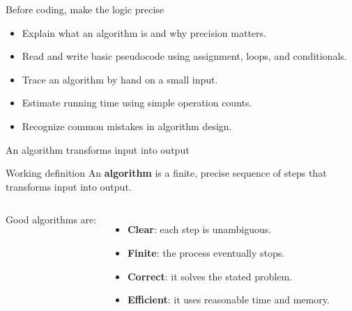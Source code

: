 \documentclass[11pt,aspectratio=43]{beamer}
\begin{document}
\begin{frame}{Before coding, make the logic precise}
\begin{itemize}
  \item Explain what an algorithm is and why precision matters.
  \item Read and write basic pseudocode using assignment, loops, and conditionals.
  \item Trace an algorithm by hand on a small input.
  \item Estimate running time using simple operation counts.
  \item Recognize common mistakes in algorithm design.
\end{itemize}
\end{frame}

\begin{frame}{An algorithm transforms input into output}
\begin{block}{Working definition}
  An \textbf{algorithm} is a finite, precise sequence of steps that transforms input into output.
\end{block}

\vspace{0.5em}
\begin{columns}[T]
    Good algorithms are:
    \begin{itemize}
      \item \textbf{Clear}: each step is unambiguous.
      \item \textbf{Finite}: the process eventually stops.
      \item \textbf{Correct}: it solves the stated problem.
      \item \textbf{Efficient}: it uses reasonable time and memory.
    \end{itemize}
\end{columns}
\end{frame}
\end{document}
